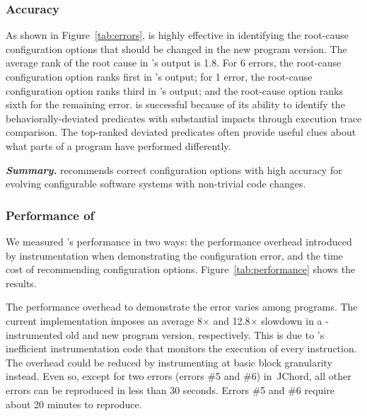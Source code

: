 \subsubsection{Accuracy}
\label{sec:accuracy}

As shown in Figure~\ref{tab:errors}, \ourtool is highly effective
in identifying the root-cause configuration options that should
be changed in the new program version. The average rank of
the root cause in \ourtool's output is 1.8. For 6 errors, the
root-cause configuration option ranks first in \ourtool's output;
for 1 error, the root-cause configuration option ranks third
in \ourtool's output; and the root-cause option ranks sixth
for the remaining error. \ourtool is successful because of its
ability to identify the behaviorally-deviated predicates with
substantial impacts through execution trace comparison.
The top-ranked deviated predicates often provide
useful clues about what parts of a program have performed
differently.




\vspace{1mm}

\noindent \textbf{\textit{Summary.}} \ourtool
recommends correct configuration options with
high accuracy for evolving configurable software systems
with non-trivial code changes.

\subsubsection{Performance of \ourtool}
\label{sec:timecost}

We measured \ourtool's performance in two ways:
the performance overhead introduced by instrumentation
when demonstrating the configuration error,
and the time cost of recommending configuration options.
Figure~\ref{tab:performance} shows the results.

The performance overhead to demonstrate the error
varies among programs. The current implementation
imposes an average 8$\times$ and 12.8$\times$ slowdown in a
\ourtool-instrumented old and new program version, respectively.
This is due to \ourtool's inefficient instrumentation code that
monitors the execution of every instruction.
The overhead could be reduced by instrumenting
at basic block granularity instead.
Even so, except for two errors (errors \#5 and \#6) in\
JChord,  all other errors can
be reproduced in less than 30 seconds. Errors \#5 and \#6
require about 20 minutes to reproduce.

